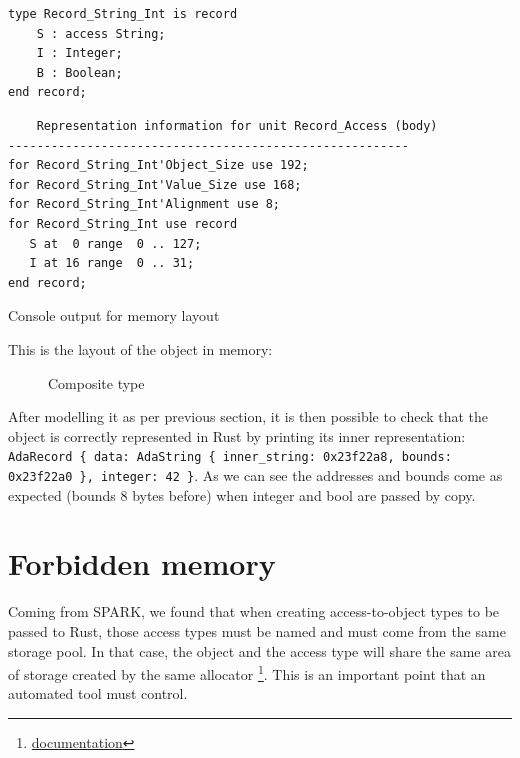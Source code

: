 \documentclass[nomenclature, english, bibtex]{kththesis}
\newcommand{\inlinecode}[1]{\texttt{#1}}
\begin{document}
\begin{listing}[!ht]
\begin{verbatim}
type Record_String_Int is record
    S : access String;
    I : Integer;
    B : Boolean;
end record;
\end{verbatim}
\label{lst:composite}
\end{listing}
\FloatBarrier

\begin{listing}[!ht]
\begin{verbatim}
    Representation information for unit Record_Access (body)
--------------------------------------------------------
for Record_String_Int'Object_Size use 192;
for Record_String_Int'Value_Size use 168;
for Record_String_Int'Alignment use 8;
for Record_String_Int use record
   S at  0 range  0 .. 127;
   I at 16 range  0 .. 31;
end record;
\end{verbatim}
\caption[mem layout output]{Console output for memory layout}
\label{lst:gnatrj}
\end{listing}
\FloatBarrier

This is the layout of the object in memory:

\begin{figure}[ht!]
    \centering
  \caption{Composite type}
  \label{fig:memlayout}
\end{figure}

After modelling it as per previous section, it is then possible to check that the object is correctly represented in Rust by printing its inner representation: 
\inlinecode{AdaRecord \{ data: AdaString \{ inner\_string: 0x23f22a8, bounds: 0x23f22a0 \}, integer: 42 \}}. As we can see the addresses and bounds come as expected (bounds 8 bytes before) when integer and bool are passed by copy.

\section{Forbidden memory}

Coming from SPARK, we found that when creating access-to-object types to be passed to Rust, those access types must be named and must come from the same storage pool. In that case, the object and the access type will share the same area of storage created by the same allocator \footnote{\href{https://www.adaic.org/resources/add_content/standards/05aarm/html/AA-3-10.html}{documentation}}. This is an important point that an automated tool must control.  
\end{document}
